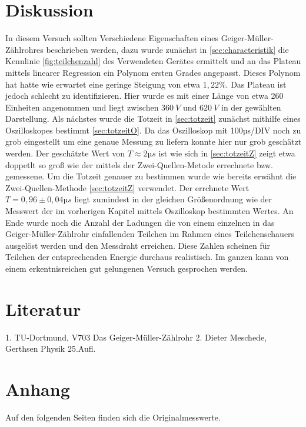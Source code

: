 \section{Diskussion}
\label{sec:diskussion}
In diesem Versuch sollten Verschiedene Eigenschaften eines Geiger-Müller-Zählrohres beschrieben werden, dazu 
wurde zunächst in \autoref{sec:characteristik} die Kennlinie \autoref{fig:teilchenzahl} 
des Verwendeten Gerätes ermittelt und an das Plateau mittels linearer Regression ein Polynom ersten Grades 
angepasst. Dieses Polynom hat hatte wie erwartet eine geringe Steigung von etwa $1,22\%$. Das Plateau ist 
jedoch schlecht zu identifizieren. Hier wurde es mit einer Länge von etwa 260 Einheiten angenommen und liegt 
zwischen $\SI{360}{V}$ und $\SI{620}{V}$ in der gewählten Darstellung. Als nächstes wurde die Totzeit in 
\autoref{sec:totzeit} zunächst mithilfe eines Oszilloskopes bestimmt \autoref{sec:totzeitO}. Da das Oszilloskop
mit 100µs/DIV noch zu grob eingestellt um eine genaue Messung zu liefern konnte hier nur grob geschätzt werden.
Der geschätzte Wert von $T\approx 2µs$ ist wie sich in \autoref{sec:totzeitZ} zeigt etwa doppetlt so groß wie
der mittels der Zwei-Quellen-Metode errechnete bzw. gemessene. Um die Totzeit genauer zu bestimmen wurde wie 
bereits erwähnt die Zwei-Quellen-Methode \autoref{sec:totzeitZ} verwendet. Der errchnete Wert $T=0,96\pm0,04µs$
liegt zumindest in der gleichen Größenordnung wie der Messwert der im vorherigen Kapitel mittels Oszilloskop 
bestimmten Wertes. An Ende wurde noch die Anzahl der Ladungen die von einem einzelnen in das Geiger-Müller-Zählrohr
einfallenden Teilchen im Rahmen eines Teilchenschauers ausgelöst werden und den Messdraht erreichen. Diese
Zahlen scheinen für Teilchen der entsprechenden Energie durchaus realistisch. Im ganzen kann von einem 
erkentnisreichen gut gelungenen Versuch gesprochen werden.

\section{Literatur}
\label{sec:literatur}
1. TU-Dortmund, V703 Das Geiger-Müller-Zählrohr
2. Dieter Meschede, Gerthsen Physik 25.Aufl.

\section{Anhang}
\label{sec:anhang}
Auf den folgenden Seiten finden sich die Originalmesswerte.